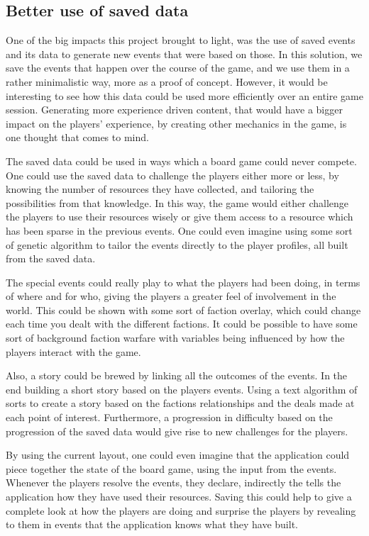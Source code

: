 \subsection{Better use of saved data}
\label{sec:savdat}
One of the big impacts this project brought to light, was the use of saved events and its data to generate new events that were based on those. In this solution, we save the events that happen over the course of the game, and we use them in a rather minimalistic way, more as a proof of concept. However, it would be interesting to see how this data could be used more efficiently over an entire game session. Generating more experience driven content, that would have a bigger impact on the players' experience, by creating other mechanics in the game, is one thought that comes to mind. 

The saved data could be used in ways which a board game could never compete. One could use the saved data to challenge the players either more or less, by knowing the number of resources they have collected, and tailoring the possibilities from that knowledge. In this way, the game would either challenge the players to use their resources wisely or give them access to a resource which has been sparse in the previous events. 
One could even imagine using some sort of genetic algorithm to tailor the events directly to the player profiles, all built from the saved data.

The special events could really play to what the players had been doing, in terms of where and for who, giving the players a greater feel of involvement in the world. This could be shown with some sort of faction overlay, which could change each time you dealt with the different factions. It could be possible to have some sort of background faction warfare with variables being influenced by how the players interact with the game.

Also, a story could be brewed by linking all the outcomes of the events. In the end building a short story based on the players events. Using a text algorithm of sorts to create a story based on the factions relationships and the deals made at each point of interest. 
Furthermore, a progression in difficulty based on the progression of the saved data would give rise to new challenges for the players.

By using the current layout, one could even imagine that the application could piece together the state of the board game, using the input from the events. Whenever the players resolve the events, they declare, indirectly the tells the application how they have used their resources. Saving this could help to give a complete look at how the players are doing and surprise the players by revealing to them in events that the application knows what they have built.

